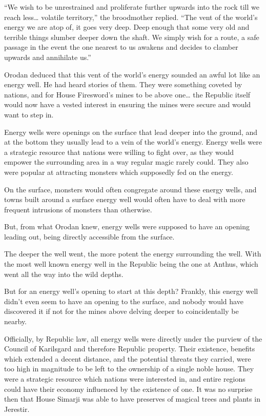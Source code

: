 \documentclass[a4paper,10pt]{book}
\begin{document}
“We wish to be unrestrained and proliferate further upwards into the rock till we reach less… volatile territory,” the broodmother replied. “The vent of the world’s energy we are atop of, it goes very deep. Deep enough that some very old and terrible things slumber deeper down the shaft. We simply wish for a route, a safe passage in the event the one nearest to us awakens and decides to clamber upwards and annihilate us.”\par
Orodan deduced that this vent of the world’s energy sounded an awful lot like an energy well. He had heard stories of them. They were something coveted by nations, and for House Firesword’s mines to be above one… the Republic itself would now have a vested interest in ensuring the mines were secure and would want to step in.\par
Energy wells were openings on the surface that lead deeper into the ground, and at the bottom they usually lead to a vein of the world’s energy. Energy wells were a strategic resource that nations were willing to fight over, as they would empower the surrounding area in a way regular magic rarely could. They also were popular at attracting monsters which supposedly fed on the energy.\par
On the surface, monsters would often congregate around these energy wells, and towns built around a surface energy well would often have to deal with more frequent intrusions of monsters than otherwise.\par
But, from what Orodan knew, energy wells were supposed to have an opening leading out, being directly accessible from the surface.\par
The deeper the well went, the more potent the energy surrounding the well. With the most well known energy well in the Republic being the one at Anthus, which went all the way into the wild depths.\par
But for an energy well’s opening to start at this depth? Frankly, this energy well didn’t even seem to have an opening to the surface, and nobody would have discovered it if not for the mines above delving deeper to coincidentally be nearby.\par
Officially, by Republic law, all energy wells were directly under the purview of the Council of Karilsgard and therefore Republic property. Their existence, benefits which extended a decent distance, and the potential threats they carried, were too high in magnitude to be left to the ownership of a single noble house. They were a strategic resource which nations were interested in, and entire regions could have their economy influenced by the existence of one. It was no surprise then that House Simarji was able to have preserves of magical trees and plants in Jerestir.\par
\end{document}
